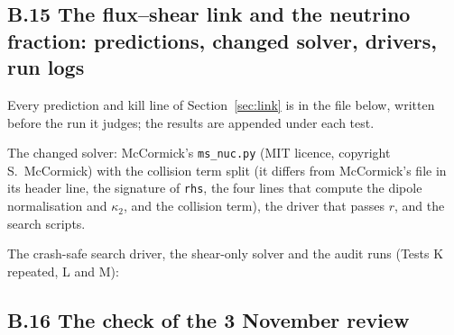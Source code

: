 \documentclass[11pt]{article}
\begin{document}
\subsection*{B.15 The flux--shear link and the neutrino fraction: predictions, changed solver, drivers, run logs}
Every prediction and kill line of Section~\ref{sec:link} is in the file below, written before the run it judges; the results are appended under each test.

The changed solver: McCormick's \texttt{ms\_nuc.py} (MIT licence, copyright S.~McCormick) with the collision term split (it differs from McCormick's file in its header line, the signature of \texttt{rhs}, the four lines that compute the dipole normalisation and $\kappa_2$, and the collision term), the driver that passes $r$, and the search scripts.






















The crash-safe search driver, the shear-only solver and the audit runs (Tests K repeated, L and M):














\subsection*{B.16 The check of the 3 November review}



\end{document}
